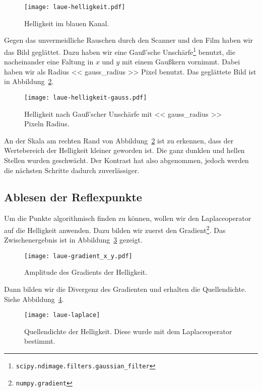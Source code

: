 \begin{figure}[htbp]
    \centering
    \texttt{[image: laue-helligkeit.pdf]}
    \caption{%
        Helligkeit im blauen Kanal.
    }
    \label{fig:laue-helligkeit}
\end{figure}

Gegen das unvermeidliche Rauschen durch den Scanner und den Film haben wir das
Bild geglättet. Dazu haben wir eine Gauß'sche
Unschärfe\footnote{\texttt{scipy.ndimage.filters.gaussian\_filter}} benutzt, die
nacheinander eine Faltung in  $x$ und $y$ mit einem Gaußkern vornimmt. Dabei
haben wir als Radius << gauss_radius >> Pixel benutzt. Das geglättete Bild ist
in Abbildung~\ref{fig:laue-gauss}.

\begin{figure}[htbp]
    \centering
    \texttt{[image: laue-helligkeit-gauss.pdf]}
    \caption{%
        Helligkeit nach Gauß'scher Unschärfe mit << gauss_radius >> Pixeln
        Radius.
    }
    \label{fig:laue-gauss}
\end{figure}

An der Skala am rechten Rand von Abbildung~\ref{fig:laue-gauss} ist zu
erkennen, dass der Wertebereich der Helligkeit kleiner geworden ist. Die ganz
dunklen und hellen Stellen wurden geschwächt. Der Kontrast hat also abgenommen,
jedoch werden die nächsten Schritte dadurch zuverlässiger.

\subsection{Ablesen der Reflexpunkte}

Um die Punkte algorithmisch finden zu können, wollen wir den Laplaceoperator
auf die Helligkeit anwenden. Dazu bilden wir zuerst den
Gradient\footnote{\texttt{numpy.gradient}}. Das Zwischenergebnis ist in
Abbildung~\ref{fig:laue-gradient} gezeigt.

\begin{figure}[htbp]
    \centering
    \texttt{[image: laue-gradient\_x\_y.pdf]}
    \caption{%
        Amplitude des Gradients der Helligkeit.
    }
    \label{fig:laue-gradient}
\end{figure}

Dann bilden wir die Divergenz des Gradienten und erhalten die Quellendichte.
Siehe Abbildung~\ref{fig:laue-laplace}.

\begin{figure}[htbp]
    \centering
    \texttt{[image: laue-laplace]}
    \caption{%
        Quellendichte der Helligkeit. Diese wurde mit dem Laplaceoperator
        bestimmt.
    }
    \label{fig:laue-laplace}
\end{figure}

